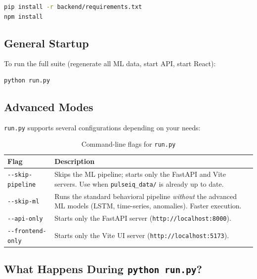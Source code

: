 \documentclass[12pt, a4paper, oneside]{report}
\begin{document}
\begin{lstlisting}[language=bash, caption={Installing dependencies}]
pip install -r backend/requirements.txt
npm install
\end{lstlisting}

\subsection{General Startup}

To run the full suite (regenerate all ML data, start API, start React):

\begin{lstlisting}[language=bash, caption={Full application launch}]
python run.py
\end{lstlisting}

\subsection{Advanced Modes}

\texttt{run.py} supports several configurations depending on your needs:

\begin{table}[H]
\centering
\caption{Command-line flags for \texttt{run.py}}
\label{tab:flags}
\begin{tabular}{@{} l p{8.5cm} @{}}
\toprule
\textbf{Flag} & \textbf{Description} \\
\midrule
\texttt{-{}-skip-pipeline} & Skips the ML pipeline; starts only the FastAPI and Vite servers. Use when \texttt{pulseiq\_data/} is already up to date.\\[4pt]
\texttt{-{}-skip-ml}       & Runs the standard behavioral pipeline \emph{without} the advanced ML models (LSTM, time-series, anomalies). Faster execution.\\[4pt]
\texttt{-{}-api-only}      & Starts only the FastAPI server (\texttt{http://localhost:8000}).\\[4pt]
\texttt{-{}-frontend-only} & Starts only the Vite UI server (\texttt{http://localhost:5173}).\\
\bottomrule
\end{tabular}
\end{table}

\subsection{What Happens During \texttt{python run.py}?}
\end{document}
